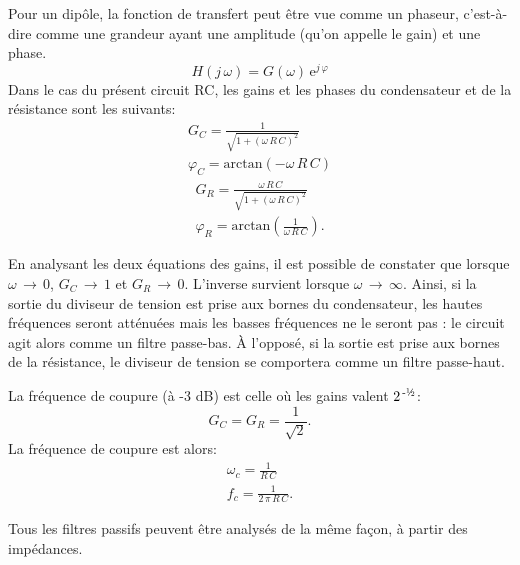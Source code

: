 \documentclass[canadien,12pt,oneside,letterpaper]{article}
\begin{document}
Pour un dipôle, la fonction de transfert peut être vue comme un phaseur, c'est-à-dire comme une grandeur ayant une amplitude (qu'on appelle le gain) et une phase.
\begin{equation}
H\!\left(j\,\omega\right)=G\!\left(\omega\right)\,\mathrm{e}^{j\,\varphi}
\end{equation}
Dans le cas du présent circuit RC, les gains et les phases du condensateur et de la résistance sont les suivants:
\begin{subequations}
\begin{gather}
G_C=\frac{1}{\sqrt{1+\left(\omega\,R\,C\right)^2}}\\
\varphi_C=\mathrm{arctan}\!\left(-\omega\,R\,C\right)
\end{gather}
\end{subequations}
\begin{subequations}
\begin{gather}
G_R=\frac{\omega\,R\,C}{\sqrt{1+\left(\omega\,R\,C\right)^2}}\\
\varphi_R=\mathrm{arctan}\!\left(\frac{1}{\omega\,R\,C}\right).
\end{gather}
\end{subequations}

En analysant les deux équations des gains, il est possible de constater que lorsque $\omega\,\rightarrow\,0$, $G_C\,\rightarrow\,1$ et $G_R\,\rightarrow\,0$. L'inverse survient lorsque $\omega\,\rightarrow\,\infty$. Ainsi, si la sortie du diviseur de tension est prise aux bornes du condensateur, les hautes fréquences seront atténuées mais les basses fréquences ne le seront pas : le circuit agit alors comme un filtre passe-bas. À l'opposé, si la sortie est prise aux bornes de la résistance, le diviseur de tension se comportera comme un filtre passe-haut.

La fréquence de coupure (à -3 dB) est celle où les gains valent $2^{\,\text{-\textonehalf}}$:
\begin{equation}
G_C=G_R=\frac{1}{\sqrt{2}}.
\end{equation}
La fréquence de coupure est alors:
\begin{subequations}
\begin{gather}
\omega_c=\frac{1}{R\,C}\\
f_c=\frac{1}{2\,\pi\,R\,C}.
\end{gather}
\end{subequations}

Tous les filtres passifs peuvent être analysés de la même façon, à partir des impédances.
\end{document}
